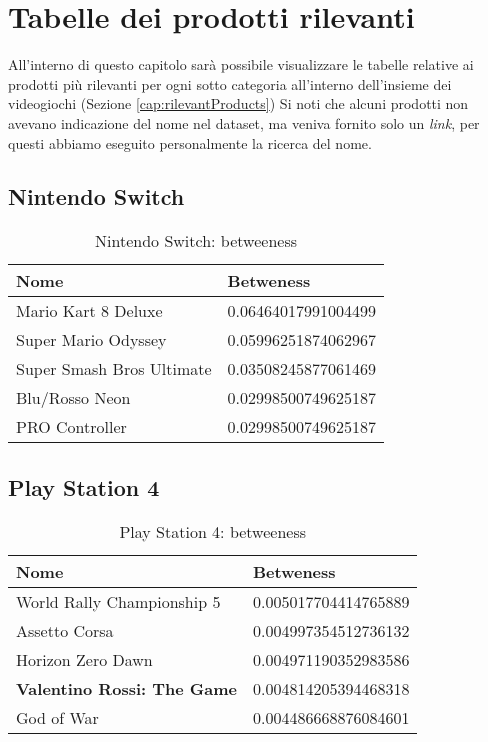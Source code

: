 \chapter{Tabelle dei prodotti rilevanti}		
\label{cap:Tabelle}
	All'interno di questo capitolo sarà possibile visualizzare le tabelle relative ai prodotti più rilevanti per ogni sotto categoria all'interno dell'insieme dei videogiochi (Sezione \ref{cap:rilevantProducts}) Si noti che alcuni prodotti non avevano indicazione del nome nel dataset, ma veniva fornito solo un \textit{link}, per questi abbiamo eseguito personalmente la ricerca del nome.
	
	\section{Nintendo Switch}
		\begin{table}[H]
			\caption{Nintendo Switch: betweeness}
			\label{tab:nintendoswitch}
			\centering
			\begin{tabular}{ll}
				\toprule 
				\textbf{Nome} & \textbf{Betweness} \\
				\midrule
				Mario Kart 8 Deluxe  & 0.06464017991004499 \\
				Super Mario Odyssey  & 0.05996251874062967 \\
				Super Smash Bros Ultimate  & 0.03508245877061469 \\
				Blu/Rosso Neon  & 0.02998500749625187 \\
				PRO Controller  & 0.02998500749625187 \\		
				\bottomrule
			\end{tabular}
		\end{table}
	
	\section{Play Station 4}
		\begin{table}[H]
			\caption{Play Station 4: betweeness}
			\label{tab:ps4}
			\centering
			\begin{tabular}{ll}
				\toprule
				\textbf{Nome} & \textbf{Betweness} \\
				\midrule
				World Rally Championship 5  & 0.005017704414765889 \\
				Assetto Corsa  & 0.004997354512736132 \\
				Horizon Zero Dawn  & 0.004971190352983586 \\
				\textbf{Valentino Rossi: The Game}  & 0.004814205394468318 \\
				God of War  & 0.004486668876084601 \\		
				\bottomrule
			\end{tabular}
		\end{table}
	
